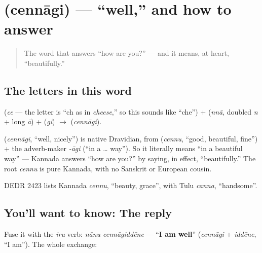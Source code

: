 \section[\texorpdfstring{\kn{ಚೆನ್ನಾಗಿ} (cennāgi)}{ಚೆನ್ನಾಗಿ (cennāgi)}]{ (cennāgi) — \textquotedblleft{}well,\textquotedblright{} and how to answer}

\label{lesson:KA-C03-cennaagi}



\begin{quote}
The word that answers \textquotedblleft{}how are you?\textquotedblright{} — and it means, at heart, \textquotedblleft{}beautifully.\textquotedblright{}
\end{quote}

\subsection*{The letters in this word}
\textbf{} (\emph{ce} — the letter \textbf{} is \textquotedblleft{}ch as in \emph{cheese},\textquotedblright{} so this sounds like \textquotedblleft{}che\textquotedblright{}) + \textbf{} (\emph{nnā}, doubled \emph{n} + long \emph{ā}) + \textbf{} (\emph{gi}) $\to$ \textbf{} (\emph{cennāgi}).

\begin{cousinweb}
\textbf{} (\emph{cennāgi}, \textquotedblleft{}well, nicely\textquotedblright{}) is native Dravidian, from \textbf{} (\emph{cennu}, \textquotedblleft{}good, beautiful, fine\textquotedblright{}) + the adverb-maker \emph{-āgi} (\textquotedblleft{}in a … way\textquotedblright{}). So it literally means \textquotedblleft{}in a beautiful way\textquotedblright{} — Kannada answers \textquotedblleft{}how are you?\textquotedblright{} by saying, in effect, \textquotedblleft{}beautifully.\textquotedblright{} The root \emph{cennu} is pure Kannada, with no Sanskrit or European cousin.

DEDR 2423 lists Kannada \emph{cennu}, \textquotedblleft{}beauty, grace\textquotedblright{}, with Tulu \emph{canna}, \textquotedblleft{}handsome\textquotedblright{}.
\end{cousinweb}

\subsection*{You'll want to know: The reply}
Fuse it with the \emph{iru} verb: \emph{nānu cennāgiddēne} — \textquotedblleft{}\textbf{I am well}\textquotedblright{} (\emph{cennāgi} + \emph{iddēne}, \textquotedblleft{}I am\textquotedblright{}). The whole exchange:

